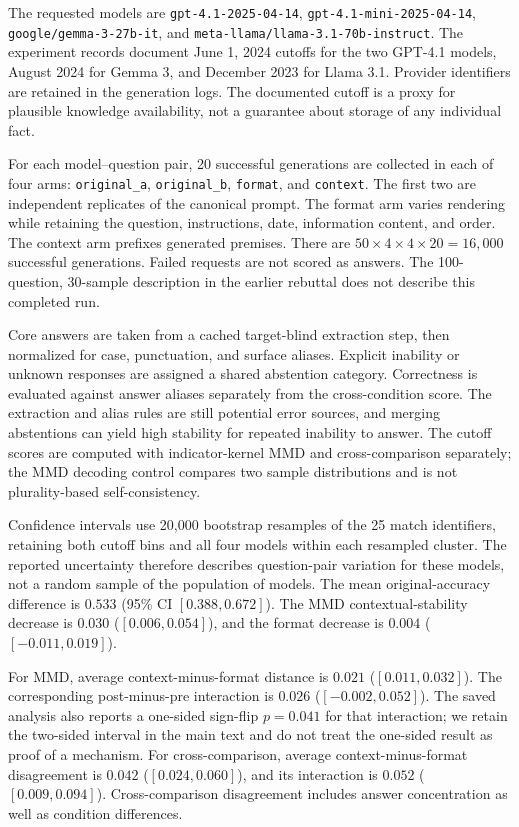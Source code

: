 \begin{revision}
The requested models are \texttt{gpt-4.1-2025-04-14}, \texttt{gpt-4.1-mini-2025-04-14}, \texttt{google/gemma-3-27b-it}, and \texttt{meta-llama/llama-3.1-70b-instruct}. The experiment records document June 1, 2024 cutoffs for the two GPT-4.1 models, August 2024 for Gemma 3, and December 2023 for Llama 3.1. Provider identifiers are retained in the generation logs. The documented cutoff is a proxy for plausible knowledge availability, not a guarantee about storage of any individual fact.

For each model--question pair, 20 successful generations are collected in each of four arms: \texttt{original\_a}, \texttt{original\_b}, \texttt{format}, and \texttt{context}. The first two are independent replicates of the canonical prompt. The format arm varies rendering while retaining the question, instructions, date, information content, and order. The context arm prefixes generated premises. There are $50\times4\times4\times20=16{,}000$ successful generations. Failed requests are not scored as answers. The 100-question, 30-sample description in the earlier rebuttal does not describe this completed run.

Core answers are taken from a cached target-blind extraction step, then normalized for case, punctuation, and surface aliases. Explicit inability or unknown responses are assigned a shared abstention category. Correctness is evaluated against answer aliases separately from the cross-condition score. The extraction and alias rules are still potential error sources, and merging abstentions can yield high stability for repeated inability to answer. The cutoff scores are computed with indicator-kernel MMD and cross-comparison separately; the MMD decoding control compares two sample distributions and is not plurality-based self-consistency.



Confidence intervals use 20,000 bootstrap resamples of the 25 match identifiers, retaining both cutoff bins and all four models within each resampled cluster. The reported uncertainty therefore describes question-pair variation for these models, not a random sample of the population of models. The mean original-accuracy difference is $0.533$ (95\% CI $[0.388,0.672]$). The MMD contextual-stability decrease is $0.030$ ($[0.006,0.054]$), and the format decrease is $0.004$ ($[-0.011,0.019]$).

For MMD, average context-minus-format distance is $0.021$ ($[0.011,0.032]$). The corresponding post-minus-pre interaction is $0.026$ ($[-0.002,0.052]$). The saved analysis also reports a one-sided sign-flip $p=0.041$ for that interaction; we retain the two-sided interval in the main text and do not treat the one-sided result as proof of a mechanism. For cross-comparison, average context-minus-format disagreement is $0.042$ ($[0.024,0.060]$), and its interaction is $0.052$ ($[0.009,0.094]$). Cross-comparison disagreement includes answer concentration as well as condition differences.


\end{revision}
